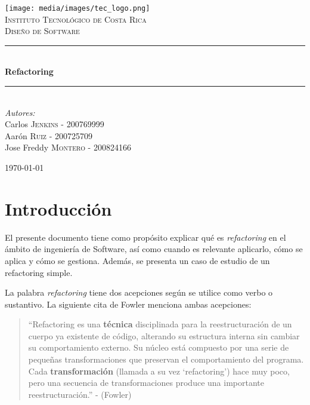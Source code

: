 \documentclass{article}
\begin{document}
\newcommand{\HRule}{\rule{\linewidth}{0.5mm}}

\begin{titlepage}
\begin{center}

\texttt{[image: media/images/tec\_logo.png]}\\[1cm]
\textsc{\LARGE Instituto Tecnológico de Costa Rica}\\[1.5cm]
\textsc{\Large Diseño de Software}\\[0.5cm]


\HRule \\[0.4cm]
{ \huge \bfseries Refactoring}\\[0.4cm]
\HRule \\[1.5cm]


\emph{Autores:}\\
Carlos \textsc{Jenkins} - 200769999\\
Aarón \textsc{Ruiz} - 200725709\\
Jose Freddy \textsc{Montero} - 200824166\\

\vfill

{\large \today}

\end{center}
\end{titlepage}

\tableofcontents

\newpage


\hypertarget{introduccion}{}
\section{Introducción}

El presente documento tiene como propósito explicar qué es \textit{refactoring} en el ámbito de 
ingeniería de Software, así como cuando es relevante aplicarlo, cómo se aplica y cómo se gestiona.
Además, se presenta un caso de estudio de un refactoring simple.

La palabra \textit{refactoring} tiene dos acepciones según se utilice como verbo o sustantivo. La siguiente
cita de Fowler menciona ambas acepciones:

	\begin{quotation}
``Refactoring es una \textbf{técnica} disciplinada para la reestructuración de un cuerpo ya
existente de código, alterando su estructura interna sin cambiar su comportamiento
externo. Su núcleo está compuesto por una serie de pequeñas transformaciones que preservan 
el comportamiento del programa. Cada \textbf{transformación} (llamada a su vez `refactoring')
hace muy poco, pero una secuencia de transformaciones produce una importante
reestructuración.'' - (Fowler)
	\end{quotation}
\end{document}
